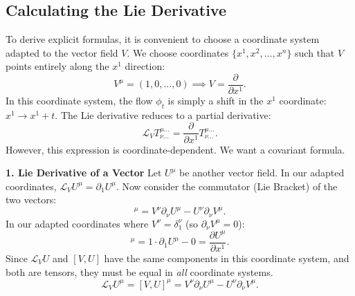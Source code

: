 \documentclass[11pt, a4paper]{report}
\begin{document}
\subsection*{Calculating the Lie Derivative}
To derive explicit formulas, it is convenient to choose a coordinate system adapted to the vector field $V$. We choose coordinates $\{x^1, x^2, \dots, x^n\}$ such that $V$ points entirely along the $x^1$ direction:
\begin{equation}
V^\mu = (1, 0, \dots, 0) \implies V = \frac{\partial}{\partial x^1}.
\end{equation}
In this coordinate system, the flow $\phi_t$ is simply a shift in the $x^1$ coordinate: $x^1 \to x^1 + t$. The Lie derivative reduces to a partial derivative:
\begin{equation}
\mathcal{L}_V T^{\mu \dots}_{\nu \dots} = \frac{\partial}{\partial x^1} T^{\mu \dots}_{\nu \dots}.
\end{equation}
However, this expression is coordinate-dependent. We want a covariant formula.

\textbf{1. Lie Derivative of a Vector}
Let $U^\mu$ be another vector field. In our adapted coordinates, $\mathcal{L}_V U^\mu = \partial_1 U^\mu$.
Now consider the commutator (Lie Bracket) of the two vectors:
\begin{equation}
[V, U]^\mu = V^\nu \partial_\nu U^\mu - U^\nu \partial_\nu V^\mu.
\end{equation}
In our adapted coordinates where $V^\nu = \delta^\nu_1$ (so $\partial_\nu V^\mu = 0$):
\begin{equation}
[V, U]^\mu = 1 \cdot \partial_1 U^\mu - 0 = \frac{\partial U^\mu}{\partial x^1}.
\end{equation}
Since $\mathcal{L}_V U$ and $[V, U]$ have the same components in this coordinate system, and both are tensors, they must be equal in \textit{all} coordinate systems.
\begin{equation}
\mathcal{L}_V U^\mu = [V, U]^\mu = V^\nu \partial_\nu U^\mu - U^\nu \partial_\nu V^\mu.
\end{equation}
\end{document}
